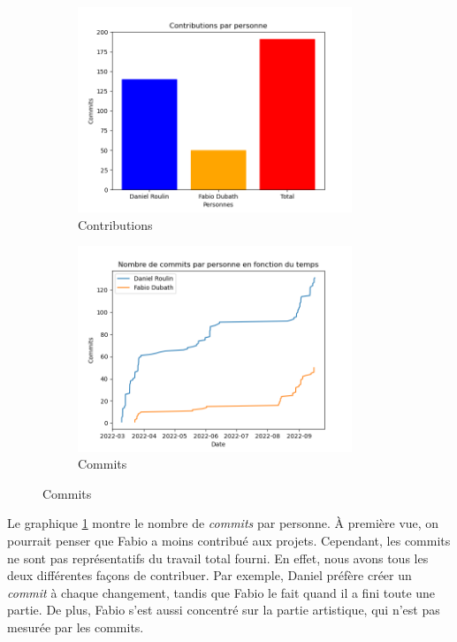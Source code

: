 \documentclass[a4paper]{article}
\begin{document}
\begin{figure}[h]
    \begin{subfigure}{0.5\textwidth}
        \includegraphics[width=0.9\textwidth]{images/stats/contributions.png}
        \centering
        \caption{Contributions}
        \label{fig:contributions}
    \end{subfigure}
        \begin{subfigure}{0.5\textwidth}
        \includegraphics[width=0.9\textwidth]{images/stats/commits.png}
        \centering
        \caption{Commits}
        \label{fig:commits}
    \end{subfigure}
\end{figure}

\noindent Le graphique \ref{fig:contributions} montre le nombre de \textit{commits} par personne. À première vue, on pourrait penser que Fabio a moins contribué aux projets. Cependant, les commits ne sont pas représentatifs du travail total fourni. En effet, nous avons tous les deux différentes façons de contribuer. Par exemple, Daniel préfère créer un \textit{commit} à chaque changement, tandis que Fabio le fait quand il a fini toute une partie. De plus, Fabio s’est aussi concentré sur la partie artistique, qui n’est pas mesurée par les commits.\\
\end{document}
